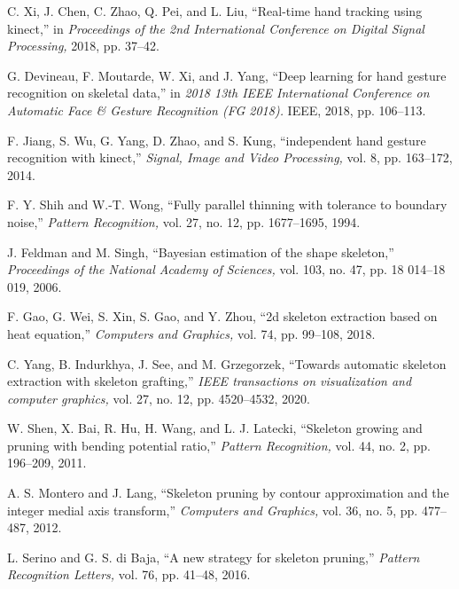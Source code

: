 \documentclass[twocolumn]{article}
\begin{document}
\begin{itemize}
{  \renewcommand{\labelitemi}{[10]}
  \item C. Xi, J. Chen, C. Zhao, Q. Pei, and L. Liu, “Real-time hand tracking using kinect,” in \textit{Proceedings of the 2nd International Conference on Digital Signal Processing,} 2018, pp. 37–42. 
  \renewcommand{\labelitemi}{[11]}
  \item G. Devineau, F. Moutarde, W. Xi, and J. Yang, “Deep learning for hand gesture recognition on skeletal data,” in \textit{2018 13th IEEE International Conference on Automatic Face \& Gesture Recognition (FG 2018).} IEEE, 2018, pp. 106–113. 
  \renewcommand{\labelitemi}{[12]}
  \item F. Jiang, S. Wu, G. Yang, D. Zhao, and S. Kung, “independent hand gesture recognition with kinect,”\textit{ Signal, Image and Video Processing,} vol. 8, pp. 163–172, 2014. 
  \renewcommand{\labelitemi}{[13]}
  \item F. Y. Shih and W.-T. Wong, “Fully parallel thinning with tolerance to boundary noise,” \textit{Pattern Recognition,} vol. 27, no. 12, pp. 1677–1695, 1994. 
  \renewcommand{\labelitemi}{[14]}
  \item J. Feldman and M. Singh, “Bayesian estimation of the shape skeleton,” \textit{Proceedings of the National Academy of Sciences,} vol. 103, no. 47, pp. 18 014–18 019, 2006. 
  \renewcommand{\labelitemi}{[15]}
  \item F. Gao, G. Wei, S. Xin, S. Gao, and Y. Zhou, “2d skeleton extraction based on heat equation,” \textit{Computers and Graphics,} vol. 74, pp. 99–108, 2018. 
  \renewcommand{\labelitemi}{[16]}
  \item C. Yang, B. Indurkhya, J. See, and M. Grzegorzek, “Towards automatic skeleton extraction with skeleton grafting,” \textit{IEEE transactions on visualization and computer graphics,} vol. 27, no. 12, pp. 4520–4532, 2020. 
  \renewcommand{\labelitemi}{[17]}
  \item W. Shen, X. Bai, R. Hu, H. Wang, and L. J. Latecki, “Skeleton growing and pruning with bending potential ratio,” \textit{Pattern Recognition,} vol. 44, no. 2, pp. 196–209, 2011. 
  \renewcommand{\labelitemi}{[18]}
  \item A. S. Montero and J. Lang, “Skeleton pruning by contour approximation and the integer medial axis transform,” \textit{Computers and Graphics,} vol. 36, no. 5, pp. 477–487, 2012. \renewcommand{\labelitemi}{[19]}
  \item L. Serino and G. S. di Baja, “A new strategy for skeleton pruning,” \textit{Pattern Recognition Letters,} vol. 76, pp. 41–48, 2016. 
}
\end{itemize}
\end{document}
